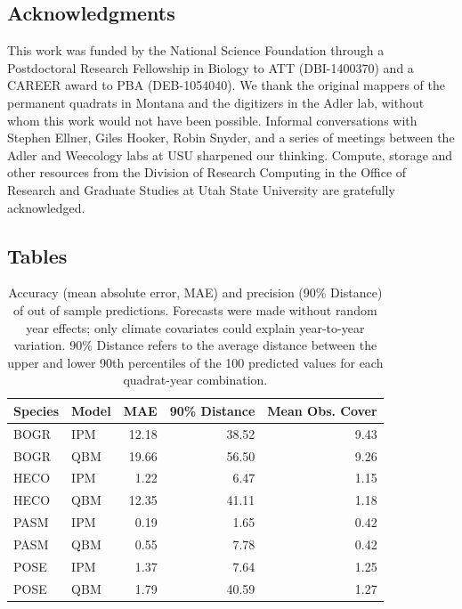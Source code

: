 \documentclass[12pt,]{article}
\begin{document}
\subsection{Acknowledgments}\label{acknowledgments}

This work was funded by the National Science Foundation through a
Postdoctoral Research Fellowship in Biology to ATT (DBI-1400370) and a
CAREER award to PBA (DEB-1054040). We thank the original mappers of the
permanent quadrats in Montana and the digitizers in the Adler lab,
without whom this work would not have been possible. Informal
conversations with Stephen Ellner, Giles Hooker, Robin Snyder, and a
series of meetings between the Adler and Weecology labs at USU sharpened
our thinking. Compute, storage and other resources from the Division of
Research Computing in the Office of Research and Graduate Studies at
Utah State University are gratefully acknowledged.

\pagebreak{}

\subsection{Tables}\label{tables}

\begin{table}[ht]
\centering
\caption{Accuracy (mean absolute error, MAE) and precision (90\% Distance) of out of sample predictions. Forecasts were made without random year effects; only climate covariates could explain year-to-year variation. 90\% Distance refers to the average distance between the upper and lower 90th percentiles of the 100 predicted values for each quadrat-year combination.} 
\begin{tabular}{llrrr}
  \hline
Species & Model & MAE & 90\% Distance & Mean Obs. Cover \\ 
  \hline
BOGR & IPM & 12.18 & 38.52 & 9.43 \\ 
  BOGR & QBM & 19.66 & 56.50 & 9.26 \\ 
  HECO & IPM & 1.22 & 6.47 & 1.15 \\ 
  HECO & QBM & 12.35 & 41.11 & 1.18 \\ 
  PASM & IPM & 0.19 & 1.65 & 0.42 \\ 
  PASM & QBM & 0.55 & 7.78 & 0.42 \\ 
  POSE & IPM & 1.37 & 7.64 & 1.25 \\ 
  POSE & QBM & 1.79 & 40.59 & 1.27 \\ 
   \hline
\end{tabular}
\end{table}
\end{document}
